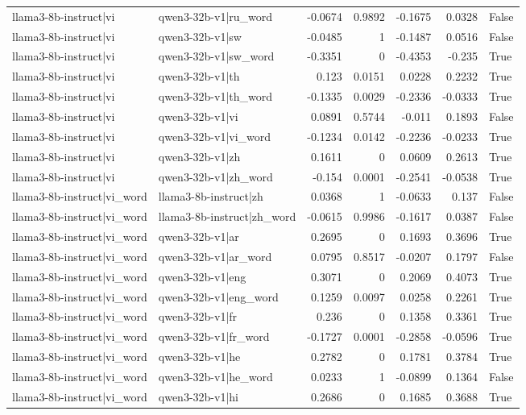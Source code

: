 \begin{table}
\begin{tabular}{l l r r r r l}
llama3-8b-instruct|vi & qwen3-32b-v1|ru_word & -0.0674 & 0.9892 & -0.1675 & 0.0328 & False \\
llama3-8b-instruct|vi & qwen3-32b-v1|sw & -0.0485 & 1 & -0.1487 & 0.0516 & False \\
llama3-8b-instruct|vi & qwen3-32b-v1|sw_word & -0.3351 & 0 & -0.4353 & -0.235 & True \\
llama3-8b-instruct|vi & qwen3-32b-v1|th & 0.123 & 0.0151 & 0.0228 & 0.2232 & True \\
llama3-8b-instruct|vi & qwen3-32b-v1|th_word & -0.1335 & 0.0029 & -0.2336 & -0.0333 & True \\
llama3-8b-instruct|vi & qwen3-32b-v1|vi & 0.0891 & 0.5744 & -0.011 & 0.1893 & False \\
llama3-8b-instruct|vi & qwen3-32b-v1|vi_word & -0.1234 & 0.0142 & -0.2236 & -0.0233 & True \\
llama3-8b-instruct|vi & qwen3-32b-v1|zh & 0.1611 & 0 & 0.0609 & 0.2613 & True \\
llama3-8b-instruct|vi & qwen3-32b-v1|zh_word & -0.154 & 0.0001 & -0.2541 & -0.0538 & True \\
llama3-8b-instruct|vi_word & llama3-8b-instruct|zh & 0.0368 & 1 & -0.0633 & 0.137 & False \\
llama3-8b-instruct|vi_word & llama3-8b-instruct|zh_word & -0.0615 & 0.9986 & -0.1617 & 0.0387 & False \\
llama3-8b-instruct|vi_word & qwen3-32b-v1|ar & 0.2695 & 0 & 0.1693 & 0.3696 & True \\
llama3-8b-instruct|vi_word & qwen3-32b-v1|ar_word & 0.0795 & 0.8517 & -0.0207 & 0.1797 & False \\
llama3-8b-instruct|vi_word & qwen3-32b-v1|eng & 0.3071 & 0 & 0.2069 & 0.4073 & True \\
llama3-8b-instruct|vi_word & qwen3-32b-v1|eng_word & 0.1259 & 0.0097 & 0.0258 & 0.2261 & True \\
llama3-8b-instruct|vi_word & qwen3-32b-v1|fr & 0.236 & 0 & 0.1358 & 0.3361 & True \\
llama3-8b-instruct|vi_word & qwen3-32b-v1|fr_word & -0.1727 & 0.0001 & -0.2858 & -0.0596 & True \\
llama3-8b-instruct|vi_word & qwen3-32b-v1|he & 0.2782 & 0 & 0.1781 & 0.3784 & True \\
llama3-8b-instruct|vi_word & qwen3-32b-v1|he_word & 0.0233 & 1 & -0.0899 & 0.1364 & False \\
llama3-8b-instruct|vi_word & qwen3-32b-v1|hi & 0.2686 & 0 & 0.1685 & 0.3688 & True \\

\end{tabular}
\end{table}
